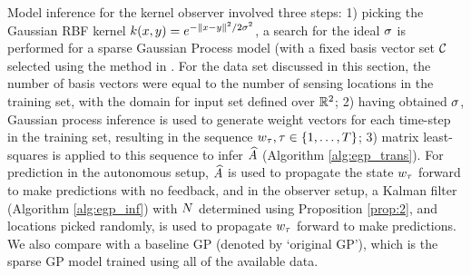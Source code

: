 Model inference for the kernel observer involved three steps: 1) picking the Gaussian RBF kernel $k(x,y) = e^{-\|x-y\|^2/2\sigma^2}$, a search for the ideal $\sigma$ is performed for a sparse Gaussian Process model (with a fixed basis vector set $\mathcal{C}$ selected using the method in \cite{csato2002sparse}. %
{For the data set discussed in this section, the number of basis vectors were equal to the number of sensing locations in the training set, with the domain for input set defined over $ \mathbb{R}^2 $}; 2) having obtained $\sigma$, Gaussian process inference is used to generate weight vectors for each time-step in the training set, resulting in the sequence $w_\tau, \tau\in\{1,\dots,T\}$; 3) matrix least-squares is applied to this sequence to infer $\widehat{A}$ (Algorithm \ref{alg:egp_trans}). For prediction in the autonomous setup, $\widehat{A}$ is used to propagate the state $w_{\tau}$ forward to make predictions with no feedback, and in the observer setup, a Kalman filter (Algorithm \ref{alg:egp_inf}) with $N$ determined using Proposition \ref{prop:2}, and locations picked randomly, is used to propagate $w_{\tau}$ forward to make predictions. We also compare with a baseline GP (denoted by `original GP'), which is the sparse GP model trained using all of the available data. 

